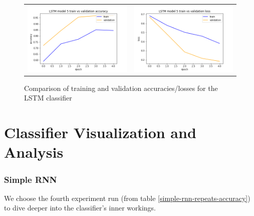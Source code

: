 \begin{figure}
\begin{tabular}{cc}
\includegraphics[width=6.5cm]{images/classifier/model-output-lstm-339/model-5-train-vs-validation-accuracy}&
\includegraphics[width=6.5cm]{images/classifier/model-output-lstm-339/model-5-train-vs-validation-loss}\\

\end{tabular}
    \caption{Comparison of training and validation accuracies/losses for the LSTM classifier}
    \label{lstm-acc-loss}
\end{figure}

\section{Classifier Visualization and\\ Analysis}
\label{classifier-visualization}

\subsubsection{Simple RNN} 

We choose the fourth experiment run (from table \ref{simple-rnn-repeats-accuracy}) to dive deeper into the classifier's inner workings.

